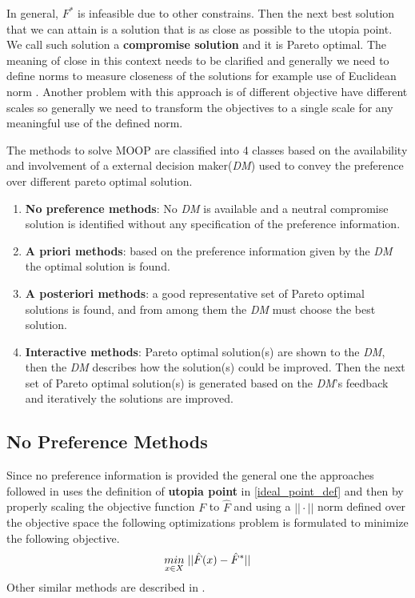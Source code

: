 In general, $F^{*}$ is infeasible due to other constrains. Then the next best solution that we can attain is a solution that is as close as possible to the utopia point. We call such solution a \textbf{compromise solution} and it is Pareto optimal. The meaning of close in this context needs to be clarified and generally we need to define norms to measure closeness of the solutions for example use of Euclidean norm \cite{vincent1983game}. Another problem with this approach is of different objective have different scales so generally we need to transform the objectives to a single scale for any meaningful use of the defined norm.

The methods to solve MOOP are classified into 4 classes \cite{hwang2012multiple} based on the availability and involvement of a external decision maker(\textit{DM}) used to convey the preference over different pareto optimal solution.
\begin{enumerate}
    \item \textbf{No preference methods}: No \textit{DM} is available and a neutral compromise solution is identified without any specification of the preference information.
    \item \textbf{A priori methods}: based on the preference information given by the \textit{DM} the optimal solution is found.
    \item \textbf{A posteriori methods}: a good representative set of Pareto optimal solutions is found, and from among them the \textit{DM} must choose the best solution.
    \item \textbf{Interactive methods}: Pareto optimal solution(s) are shown to the \textit{DM}, then the \textit{DM} describes how the solution(s) could be improved. Then the next set of Pareto optimal solution(s) is generated based on the \textit{DM}'s feedback and iteratively the solutions are improved.
\end{enumerate}

\subsection{No Preference Methods}
Since no preference information is provided the general one the approaches followed in \cite{zeleny1973compromise} uses the definition of \textbf{utopia point} in \ref{ideal_point_def} and then by properly scaling the objective function $F$ to $\hat{F}$ and using a $||\cdot||$ norm defined over the objective space the following optimizations problem is formulated to minimize the following objective.
\begin{equation}
    \underset{x \in X}{min}\hspace{1mm} ||\hat{F}(x) - \hat{F}^{*}||
\end{equation}
\newline Other similar methods are described in \cite{miettinen1998}.

